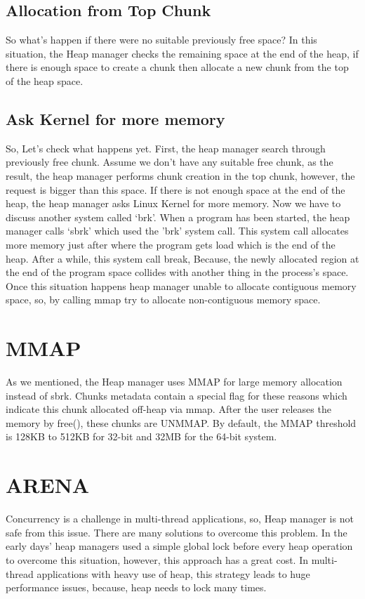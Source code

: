 \documentclass{masterthesis}
\begin{document}
\subsection{Allocation from Top Chunk}
So what’s happen if there were no suitable previously free space? In this situation, the Heap manager checks the remaining space at the end of the heap, if there is enough space to create a chunk then allocate a new chunk from the top of the heap space. 

\subsection{Ask Kernel for more memory}
So, Let's check what happens yet. First, the heap manager search through previously free chunk. Assume we don't have any suitable free chunk, as the result, the heap manager performs chunk creation in the top chunk, however, the request is bigger than this space. If there is not enough space at the end of the heap, the heap manager asks Linux Kernel for more memory. Now we have to discuss another system called ‘brk’. When a program has been started, the heap manager calls ‘sbrk’ which used the 'brk' system call. This system call allocates more memory just after where the program gets load which is the end of the heap. 
After a while, this system call break, Because, the newly allocated region at the end of the program space collides with another thing in the process’s space. Once this situation happens heap manager unable to allocate contiguous memory space, so, by calling mmap try to allocate non-contiguous memory space. 

\section{MMAP}
As we mentioned, the Heap manager uses MMAP for large memory allocation instead of sbrk. Chunks metadata contain a special flag for these reasons which indicate this chunk allocated off-heap via mmap. After the user releases the memory by free(), these chunks are UNMMAP. By default, the MMAP threshold is 128KB to 512KB for 32-bit and 32MB for the 64-bit system.

\section{ARENA}
Concurrency is a challenge in multi-thread applications, so, Heap manager is not safe from this issue. There are many solutions to overcome this problem. In the early days' heap managers used a simple global lock before every heap operation to overcome this situation, however, this approach has a great cost. In multi-thread applications with heavy use of heap, this strategy leads to huge performance issues, because, heap needs to lock many times.
\end{document}
